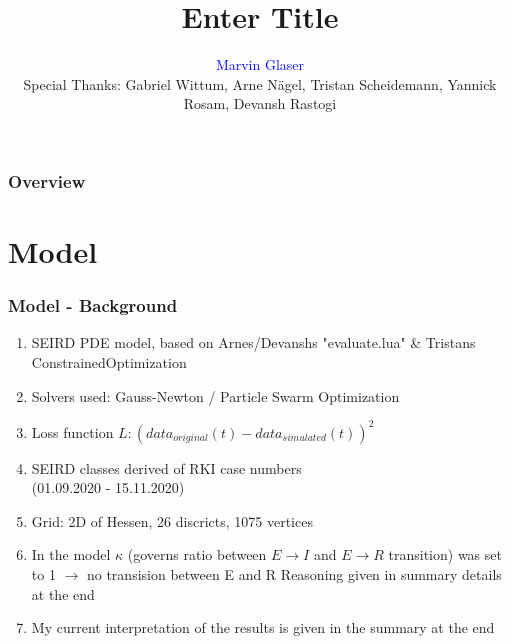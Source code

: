 \documentclass{beamer}
\title[Other thing]{Enter Title}
\author{\textcolor{blue}{Marvin Glaser\\}
\vspace{2mm}\footnotesize{Special Thanks: Gabriel Wittum, Arne N\"agel, Tristan Scheidemann, Yannick Rosam, Devansh Rastogi}} %
\institute[G-CSC] %
{
Goethe Universtiy Frankfurt - Center for Scientific Computing \\ %
\medskip
}
\begin{document}



\begin{frame}
\frametitle{Overview} 
\tableofcontents 
\end{frame}






\section{Model}
\begin{frame}
	\frametitle{Model - Background}
	\begin{enumerate}[$\bullet$]
		\item SEIRD PDE model, based on Arnes/Devanshs "evaluate.lua" \& Tristans ConstrainedOptimization
		\item Solvers used: Gauss-Newton / Particle Swarm Optimization
		\item Loss function $L: (data_{original}(t) - data_{simulated}(t))^2 $
		\item SEIRD classes derived of RKI case numbers\\(01.09.2020 - 15.11.2020)
		\item Grid: 2D of Hessen, 26 discricts, 1075 vertices
		\item In the model $\kappa$ (governs ratio between $E\rightarrow I$ and $E\rightarrow R$ transition) was set to 1
			$\rightarrow$ no transision between E and R
			Reasoning given in summary details at the end
		\item My current interpretation of the results is given in the summary at the end
	\end{enumerate}

\end{frame}
\end{document}
